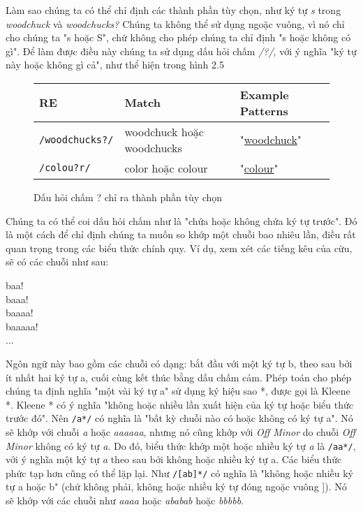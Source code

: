 Làm sao chúng ta có thể chỉ định các thành phần tùy chọn, như ký tự \textit{s} trong \textit{woodchuck} và \textit{woodchucks?} Chúng ta không thể sử dụng ngoặc vuông, vì nó chỉ cho chúng ta "s hoặc S", chứ không cho phép chúng ta chỉ định "s hoặc không có gì". Để làm được điều này chúng ta sử dụng dấu hỏi chấm \textit{/?/}, với ý nghĩa "ký tự này hoặc không gì cả", như thể hiện trong hình 2.5

\begin{figure}[h]
	\begin{tabular}{ l l l }
	 \hline
	 RE & Match & Example Patterns \\
	 \hline
	 \verb|/woodchucks?/| & woodchuck hoặc woodchucks & "\underline{woodchuck}" \\
	 \verb|/colou?r/| & color hoặc colour & "\underline{colour}" \\
	 \hline
	\end{tabular}
 \caption{Dấu hỏi chấm ? chỉ ra thành phần tùy chọn}
 \label{table:2.5}
\end{figure}

Chúng ta có thể coi dấu hỏi chấm như là "chứa hoặc không chứa ký tự trước". Đó là một cách để chỉ định chúng ta muốn so khớp một chuỗi bao nhiêu lần, điều rất quan trọng trong các biểu thức chính quy. Ví dụ, xem xét các tiếng kêu  của cừu, sẽ có các chuỗi như sau:

baa!\\
\indent baaa!\\
\indent baaaa!\\
\indent baaaaa!\\
\indent ...

Ngôn ngữ này bao gồm các chuỗi có dạng: bắt đầu với một ký tự b, theo sau bởi ít nhất hai ký tự a, cuối cùng kết thúc bằng dấu chấm cảm. Phép toán cho phép chúng ta định nghĩa "một vài ký tự a" sử dụng ký hiệu sao *, được gọi là Kleene *. Kleene * có ý nghĩa "không hoặc nhiều lần xuất hiện của ký tự hoặc biểu thức trước đó". Nên \verb|/a*/| có nghĩa là "bất kỳ chuỗi nào có hoặc không có ký tự a". Nó sẽ khớp với chuỗi \textit{a} hoặc \textit{aaaaaa}, nhưng nó cũng khớp với \textit{Off Minor} do chuỗi \textit{Off Minor} không có ký tự \textit{a}. Do đó, biểu thức khớp một hoặc nhiều ký tự \textit{a} là \verb|/aa*/|, với ý nghĩa một ký tự \textit{a} theo sau bởi không hoặc nhiều ký tự a. Các biểu thức phức tạp hơn cũng có thể lặp lại. Như \verb|/[ab]*/| có nghĩa là "không hoặc nhiều ký tự a hoặc b" (chứ không phải, không hoặc nhiều ký tự đóng ngoặc vuông ]). Nó sẽ khớp với các chuỗi như \textit{aaaa} hoặc \textit{ababab} hoặc \textit{bbbbb}.

